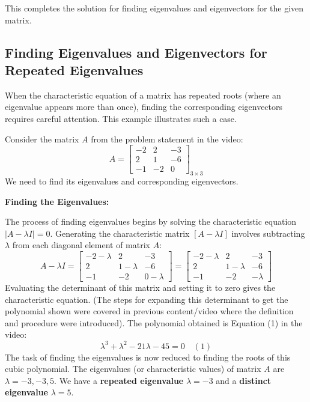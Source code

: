 \documentclass{article}
\begin{document}
This completes the solution for finding eigenvalues and eigenvectors for the given matrix.



\subsection{Finding Eigenvalues and Eigenvectors for Repeated Eigenvalues} %

When the characteristic equation of a matrix has repeated roots (where an eigenvalue appears more than once), finding the corresponding eigenvectors requires careful attention. This example illustrates such a case.

Consider the matrix $A$ from the problem statement in the video:
\[ A = \begin{bmatrix} -2 & 2 & -3 \\ 2 & 1 & -6 \\ -1 & -2 & 0 \end{bmatrix}_{3 \times 3} \]
We need to find its eigenvalues and corresponding eigenvectors.

\textbf{Finding the Eigenvalues:}

The process of finding eigenvalues begins by solving the characteristic equation $|A - \lambda I| = 0$. Generating the characteristic matrix $[A - \lambda I]$ involves subtracting $\lambda$ from each diagonal element of matrix $A$:
\[ A - \lambda I = \begin{bmatrix} -2 - \lambda & 2 & -3 \\ 2 & 1 - \lambda & -6 \\ -1 & -2 & 0 - \lambda \end{bmatrix} = \begin{bmatrix} -2 - \lambda & 2 & -3 \\ 2 & 1 - \lambda & -6 \\ -1 & -2 & -\lambda \end{bmatrix} \]
Evaluating the determinant of this matrix and setting it to zero gives the characteristic equation. (The steps for expanding this determinant to get the polynomial shown were covered in previous content/video where the definition and procedure were introduced). The polynomial obtained is Equation (1) in the video:
\[ \lambda^3 + \lambda^2 - 21\lambda - 45 = 0 \quad (1) \]
The task of finding the eigenvalues is now reduced to finding the roots of this cubic polynomial.
The eigenvalues (or characteristic values) of matrix $A$ are $\lambda = -3, -3, 5$. We have a \textbf{repeated eigenvalue} $\lambda = -3$ and a \textbf{distinct eigenvalue} $\lambda = 5$.
\end{document}
